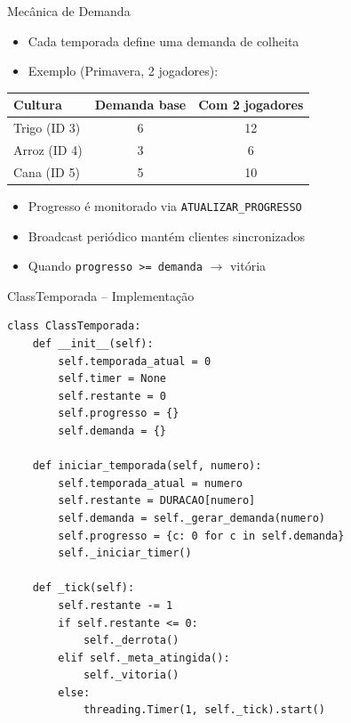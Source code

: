 \documentclass[aspectratio=169]{beamer}
\begin{document}
\begin{frame}{Mec\^anica de Demanda}
  \begin{itemize}
    \item Cada temporada define uma demanda de colheita
    \item Exemplo (Primavera, 2 jogadores):
  \end{itemize}
  \vfill
  \footnotesize
  \begin{tabular}{lcc}
    \toprule
    \textbf{Cultura} & \textbf{Demanda base} & \textbf{Com 2 jogadores} \\
    \midrule
    Trigo (ID 3) & 6 & 12 \\
    Arroz (ID 4) & 3 & 6 \\
    Cana (ID 5) & 5 & 10 \\
    \bottomrule
  \end{tabular}
  \vfill
  \begin{itemize}
    \item Progresso \'e monitorado via \texttt{ATUALIZAR\_PROGRESSO}
    \item Broadcast peri\'odico mant\'em clientes sincronizados
    \item Quando \texttt{progresso >= demanda} $\rightarrow$ vit\'oria
  \end{itemize}
\end{frame}

\begin{frame}[fragile, shrink=15]{ClassTemporada -- Implementa\c{c}\~ao}
\begin{lstlisting}[style=pycode, basicstyle=\ttfamily\footnotesize]
class ClassTemporada:
    def __init__(self):
        self.temporada_atual = 0
        self.timer = None
        self.restante = 0
        self.progresso = {}
        self.demanda = {}

    def iniciar_temporada(self, numero):
        self.temporada_atual = numero
        self.restante = DURACAO[numero]
        self.demanda = self._gerar_demanda(numero)
        self.progresso = {c: 0 for c in self.demanda}
        self._iniciar_timer()

    def _tick(self):
        self.restante -= 1
        if self.restante <= 0:
            self._derrota()
        elif self._meta_atingida():
            self._vitoria()
        else:
            threading.Timer(1, self._tick).start()
\end{lstlisting}
\end{frame}
\end{document}

